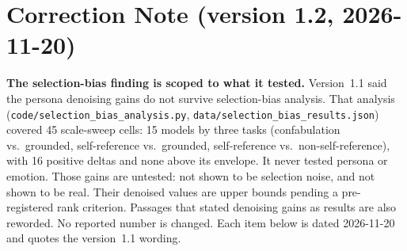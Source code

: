 \documentclass[11pt,a4paper]{article}
\begin{document}
\section*{Correction Note (version 1.2, 2026-11-20)}

\textbf{The selection-bias finding is scoped to what it tested.} Version~1.1
said the persona denoising gains do not survive selection-bias analysis. That
analysis (\texttt{code/selection\_bias\_analysis.py},
\texttt{data/selection\_bias\_results.json}) covered 45 scale-sweep cells:
15 models by three tasks (confabulation vs.\ grounded, self-reference vs.\
grounded, self-reference vs.\ non-self-reference), with 16 positive deltas
and none above its envelope. It never tested persona or emotion. Those gains
are untested: not shown to be selection noise, and not shown to be real.
Their denoised values are upper bounds pending a pre-registered rank
criterion. Passages that stated denoising gains as results are also
reworded. No reported number is changed. Each item below is dated
2026-11-20 and quotes the version~1.1 wording.
\end{document}
